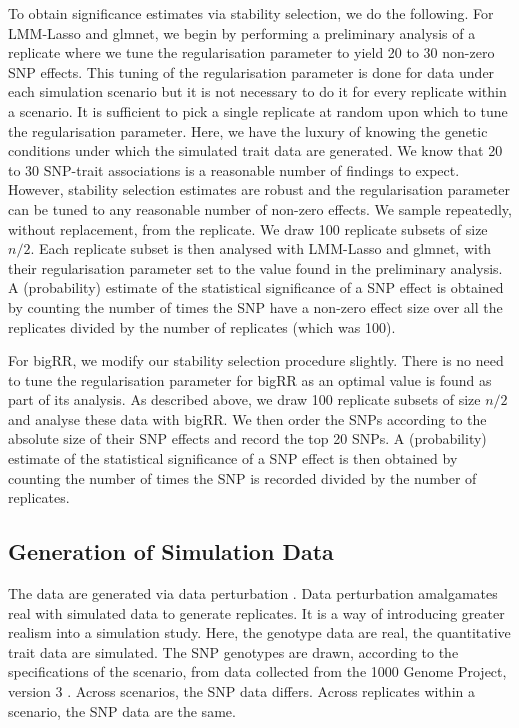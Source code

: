 \documentclass{nature}
\begin{document}
To obtain significance estimates via stability selection, we do the following. For LMM-Lasso and glmnet, we begin
 by performing a preliminary analysis of a replicate where  we tune the  regularisation parameter to yield 20 to 30 non-zero SNP effects.
This tuning of the regularisation parameter is done for data under each simulation scenario but it is not necessary to do it for every replicate within a scenario. It is sufficient to pick a single replicate at random upon which to tune the regularisation parameter. 
Here, we have the luxury of knowing the genetic conditions 
under which the simulated trait data are generated. We know that 20 to 30 SNP-trait associations is a reasonable number of findings to expect. 
 However, stability selection estimates are robust  \cite{meinshausen2010stability} 
 and the regularisation parameter can be tuned to any reasonable number of 
 non-zero effects. We sample repeatedly, without replacement, from the replicate. We draw 100 replicate subsets of size $n/2$.  
Each replicate subset is then analysed with LMM-Lasso and glmnet, with their regularisation parameter set to the value found in the preliminary analysis. 
A (probability) estimate of the statistical significance of a SNP effect is obtained by counting the 
number of times the SNP have a non-zero effect size over all the replicates divided by the number of replicates (which was 100). 

For bigRR, we modify our stability selection procedure slightly. 
There is no need to tune the regularisation parameter for bigRR as an optimal value is found as part of its analysis. 
As described above, we draw 100 replicate subsets of size $n/2$ and analyse these data with bigRR. We then order the 
SNPs according to the absolute size of their SNP effects and record the top 20 SNPs. 
A (probability)  estimate of the statistical significance of a SNP effect is then obtained by counting the 
number of times the SNP is recorded divided by the number of replicates. 




\subsection{Generation of Simulation Data}

The data are generated via data perturbation \cite{zhao2007arabidopsis}. 
Data perturbation amalgamates real with simulated data to generate replicates. 
It is a way of introducing greater realism into a simulation study. 
 Here, the genotype data are real, the 
quantitative trait data are simulated. 
 The SNP genotypes are drawn, 
according to the specifications of the scenario, from data collected from the 1000 Genome Project, version 3   \cite{10002010map}. 
Across scenarios, the SNP data differs. Across replicates within a scenario, the SNP data are the same. 
\end{document}
